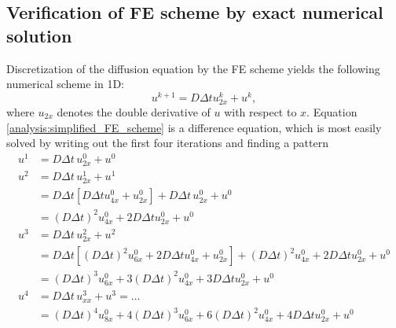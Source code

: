 \subsection{Verification of FE scheme by exact numerical solution}\label{exact_numerical_solution}

Discretization of the diffusion equation by the FE scheme yields the following numerical scheme in 1D:
\begin{equation}\label{analysis:simplified_FE_scheme}
 u^{k+1} = D\Delta t u^k_{2x} + u^k,
\end{equation}
where $u_{2x}$ denotes the double derivative of $u$ with respect to $x$. 
Equation \eqref{analysis:simplified_FE_scheme} is a difference equation, which is most easily solved by writing out the first four iterations and finding a pattern
\begin{align*}
 u^1 &= D\Delta t\, u_{2x}^0 + u^0 \\
 u^2 &= D\Delta t\, u_{2x}^1 + u^1 \\
 &= D\Delta t\left[D\Delta t u_{4x}^0 + u_{2x}^0\right] + D\Delta t\, u_{2x}^0 +u^0\\
 &= \left(D\Delta t\right)^2 u_{4x}^0 + 2D\Delta t u_{2x}^0+ u^0 \\
 u^3 &= D\Delta t\, u_{2x}^2 + u^2 \\
 &= D\Delta t\left[\left(D\Delta t\right)^2 u_{6x}^0 + 2D\Delta t u_{4x}^0+ u_{2x}^0\right] + \left(D\Delta t\right)^2 u_{4x}^0 + 2D\Delta t u_{2x}^0+ u^0\\
 &= \left(D\Delta t\right)^3 u_{6x}^0 + 3\left(D\Delta t\right)^2 u_{4x}^0+ 3D\Delta tu_{2x}^0 + u^0 \\
 u^4 &= D\Delta t \,u_{xx}^3 + u^3 = \dots \\
 &= \left(D\Delta t\right)^4 u_{8x}^0 + 4\left(D\Delta t\right)^3 u_{6x}^0+ 6\left(D\Delta t\right)^2 u_{4x}^0 + 4D\Delta t u_{2x}^0 + u^0 
\end{align*}

